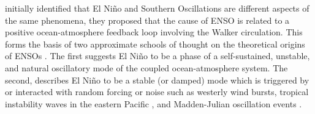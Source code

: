 \documentclass[12pt, onecolumn]{revtex4}    %
\begin{document}
\cite{doi:10.1175/1520-04931969097} initially identified that El Ni\~{n}o and Southern Oscillations are different aspects of the same phenomena, they proposed that the cause of ENSO is related to a positive ocean-atmosphere feedback loop involving the Walker circulation. This forms the basis of two approximate schools of thought on the theoretical origins of ENSOs \citep{wang2017nino}. The first suggests El Ni\~{n}o to be a phase of a self-sustained, unstable, and natural oscillatory mode of the coupled ocean-atmosphere system. The second, describes El Ni\~{n}o to be a stable (or damped) mode which is triggered by or interacted with random forcing or noise such as westerly wind bursts, tropical instability waves in the eastern Pacific \citep{An:2008aa}, and Madden-Julian oscillation events \citep{doi:10.1175/JAS4029.1}. \\





\newpage

\nocite{ruddiman_climate}


\end{document}
